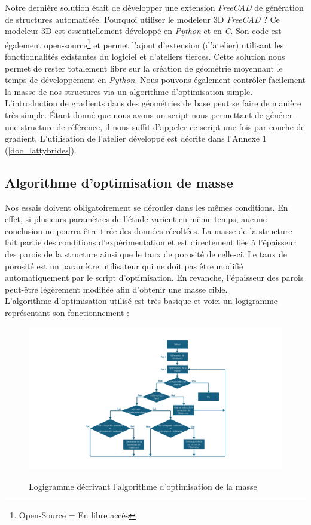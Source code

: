 \documentclass[a4paper]{article}
\begin{document}
	Notre dernière solution était de développer une extension \textit{FreeCAD} de génération de structures automatisée. Pourquoi utiliser le modeleur 3D \textit{FreeCAD} ? Ce modeleur 3D est essentiellement développé en \textit{Python} et en \textit{C}. Son code est également open-source\footnote{Open-Source = En libre accès} et permet l’ajout d’extension (d’atelier) utilisant les fonctionnalités existantes du logiciel et d’ateliers tierces. Cette solution nous permet de rester totalement libre sur la création de géométrie moyennant le temps de développement en \textit{Python}. Nous pouvons également contrôler facilement la masse de nos structures via un algorithme d’optimisation simple. L’introduction de gradients dans des géométries de base peut se faire de manière très simple. Étant donné que nous avons un script nous permettant de générer une structure de référence, il nous suffit d’appeler ce script une fois par couche de gradient. L'utilisation de l'atelier développé est décrite dans l'Annexe 1 (\ref{doc_lattybrides}).
	\newpage
	
	\subsection{Algorithme d'optimisation de masse}
	\hspace{0.5cm}Nos essais doivent obligatoirement se dérouler dans les mêmes conditions. En effet, si plusieurs paramètres de l’étude varient en même temps, aucune conclusion ne pourra être tirée des données récoltées. La masse de la structure fait partie des conditions d’expérimentation et est directement liée à l’épaisseur des parois de la structure ainsi que le taux de porosité de celle-ci. Le taux de porosité est un paramètre utilisateur qui ne doit pas être modifié automatiquement par le script d’optimisation. En revanche, l’épaisseur des parois peut-être légèrement modifiée afin d’obtenir une masse cible.\label{masse}\\
	
	\underline{L’algorithme d’optimisation utilisé est très basique et voici un logigramme représentant son fonctionnement :}\\
	
	\begin{figure}[H]
		\centering
		\includegraphics[width=16.5cm]{Images/4/log_opti_masse.pdf}\\
		\caption{Logigramme décrivant l'algorithme d'optimisation de la masse}
	\end{figure}
	\newpage
\end{document}
